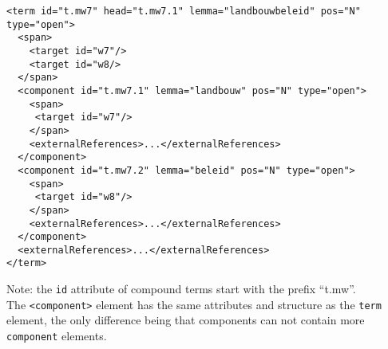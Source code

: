 \begin{Verbatim}[fontsize=\small]
<term id="t.mw7" head="t.mw7.1" lemma="landbouwbeleid" pos="N" type="open">
  <span>
    <target id="w7"/>
    <target id="w8/>
  </span>
  <component id="t.mw7.1" lemma="landbouw" pos="N" type="open">
    <span>
     <target id="w7"/>
    </span>
    <externalReferences>...</externalReferences>
  </component>
  <component id="t.mw7.2" lemma="beleid" pos="N" type="open">
    <span>
     <target id="w8"/>
    </span>
    <externalReferences>...</externalReferences>
  </component>
  <externalReferences>...</externalReferences>
</term>
\end{Verbatim}

Note: the \texttt{id} attribute of compound terms start with the prefix ``t.mw''.\\

The \texttt{<component>} element has the same attributes and structure as
the \texttt{term} element, the only difference being that components can not
contain more \texttt{component} elements.

